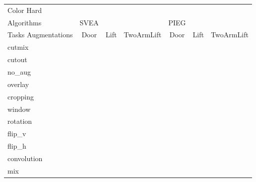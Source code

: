 \begin{tabular}{lcccccc}
Color Hard & & & & & & \\
Algorithms & SVEA & & & PIEG & & \\
Tasks Augmentations & Door & Lift & TwoArmLift & Door & Lift & TwoArmLift \\
cutmix          &  &  &  &  &  &  \\
cutout          &  &  &  &  &  &  \\
no\_aug         &  &  &  &  &  &  \\
overlay         &  &  &  &  &  &  \\
cropping        &  &  &  &  &  &  \\
window          &  &  &  &  &  &  \\
rotation        &  &  &  &  &  &  \\
flip\_v         &  &  &  &  &  &  \\
flip\_h         &  &  &  &  &  &  \\
convolution     &  &  &  &  &  &  \\
mix             &  &  &  &  &  &  \\
\end{tabular}
